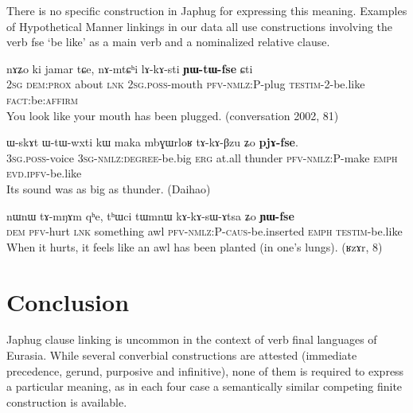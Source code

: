 \documentclass[oldfontcommands,oneside,a4paper,11pt]{article}
\newcommand{\ipa}[1]{{\phon \mbox{#1}}} %
\begin{document}
There is no specific construction in Japhug for expressing this meaning. Examples of Hypothetical Manner linkings in our data all use constructions involving the verb \ipa{fse} `be like' as a main verb and a nominalized relative clause.

\begin{exe}
\ex \label{ex:lAkAsti.YWtWfse}
\gll
\ipa{nɤʑo}         	\ipa{ki}         	\ipa{jamar}         	\ipa{tɕe,}         	\ipa{nɤ-mtɕʰi}         	\ipa{lɤ-kɤ-sti}         	\ipa{\textbf{ɲɯ-tɯ-fse}}         	\ipa{ɕti}     \\    
\textsc{2sg} \textsc{dem:prox} about \textsc{lnk} \textsc{2sg.poss}-mouth \textsc{pfv-nmlz:P}-plug \textsc{testim}-2-be.like \textsc{fact}:be:\textsc{affirm} \\
\glt You look like your mouth has been plugged. (conversation 2002, 81)
\end{exe}


\begin{exe}
\ex \label{ex:mbGWrloR.tAkABzu}
\gll
      	\ipa{ɯ-skɤt}         	\ipa{ɯ-tɯ-wxti}         	\ipa{kɯ}         	\ipa{maka}         	\ipa{mbɣɯrloʁ}         	\ipa{tɤ-kɤ-βzu}         	\ipa{ʑo}         	\ipa{\textbf{pjɤ-fse}.}         \\
  \textsc{3sg.poss}-voice \textsc{3sg-nmlz:degree}-be.big \textsc{erg} at.all thunder \textsc{pfv-nmlz:P}-make \textsc{emph} \textsc{evd.ipfv}-be.like \\
\glt Its sound was as big as thunder.  (Daihao)
\end{exe}
\begin{exe}
\ex \label{ex:tWmnW.tAkAsAtsa}
\gll
\ipa{nɯnɯ}         	\ipa{tɤ-mŋɤm}         	\ipa{qʰe,}         	\ipa{tʰɯci}         	\ipa{tɯmnɯ}         	\ipa{kɤ-kɤ-sɯ-ɤtsa}         	\ipa{ʑo}         	\ipa{\textbf{ɲɯ-fse}}         \\
\textsc{dem} \textsc{pfv}-hurt \textsc{lnk} something awl \textsc{pfv-nmlz:P-caus}-be.inserted  \textsc{emph} \textsc{testim}-be.like \\
\glt  When it hurts, it feels like an awl has been planted (in one's lungs).  (ʁzɤr, 8)
\end{exe}

\section{Conclusion}
Japhug clause linking is uncommon in the context of verb final languages of Eurasia. While  several converbial constructions are attested (immediate precedence, gerund, purposive and infinitive), none of them is required to express a particular meaning, as in each four case a semantically similar competing finite construction is available.
\end{document}
